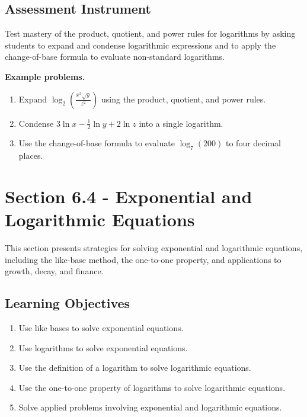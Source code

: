 \subsection{Assessment Instrument}
\label{ssec:asse-3669}

Test mastery of the product, quotient, and power rules for logarithms by asking students
to expand and condense logarithmic expressions and to apply the change-of-base formula to
evaluate non-standard logarithms.

\textbf{Example problems.}
\begin{enumerate}
    \item Expand $\log_{2}\!\left(\frac{x^{3}\sqrt{y}}{z^{2}}\right)$ using the product, quotient, and power rules.
    \item Condense $3\ln x - \frac{1}{2}\ln y + 2\ln z$ into a single logarithm.
    \item Use the change-of-base formula to evaluate $\log_{7}(200)$ to four decimal places.
\end{enumerate}

\section{Section 6.4 - Exponential and Logarithmic Equations}
\label{sec:sect-64ce}

This section presents strategies for solving exponential and logarithmic equations,
including the like-base method, the one-to-one property, and applications to growth,
decay, and finance.

\subsection{Learning Objectives}
\label{ssec:lear-fe6e}

\begin{enumerate}
    \item Use like bases to solve exponential equations.
    \item Use logarithms to solve exponential equations.
    \item Use the definition of a logarithm to solve logarithmic equations.
    \item Use the one-to-one property of logarithms to solve logarithmic equations.
    \item Solve applied problems involving exponential and logarithmic equations.
\end{enumerate}

